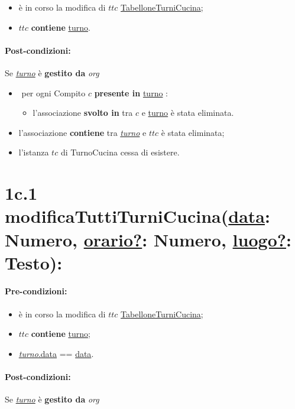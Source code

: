 \begin{itemize}
 \item è in corso la modifica di $ttc$ \underline{TabelloneTurniCucina};
 \item $ttc$ \textbf{contiene} \underline{turno}.
\end{itemize}

\paragraph{Post-condizioni:} Se \underline{\textit{turno}} è \textbf{gestito da} {\textit{org}}

\begin{itemize}
   \item \textlangle $ $ per ogni Compito $c$ \textbf{presente in} \underline{turno} \textrangle:
    \begin{itemize}
        \item l'associazione \textbf{svolto in} tra $c$ e \underline{turno} è stata eliminata.
    \end{itemize}
    \item l'associazione \textbf{contiene} tra \underline{\textit{turno}} e $ttc$ è stata eliminata;
    \item l'istanza $tc$ di TurnoCucina cessa di esistere.
\end{itemize}

\section*{1c.1 modificaTuttiTurniCucina(\underline{data}: Numero, \underline{orario?}: Numero, \underline{luogo?}: Testo):}

\paragraph{Pre-condizioni:}

\begin{itemize}
 \item è in corso la modifica di $ttc$ \underline{TabelloneTurniCucina};
 \item $ttc$ \textbf{contiene} \underline{turno};
 \item \underline{\textit{turno}.data} == \underline{data}.
\end{itemize}

\paragraph{Post-condizioni:} Se \underline{\textit{turno}} è \textbf{gestito da} {\textit{org}}

